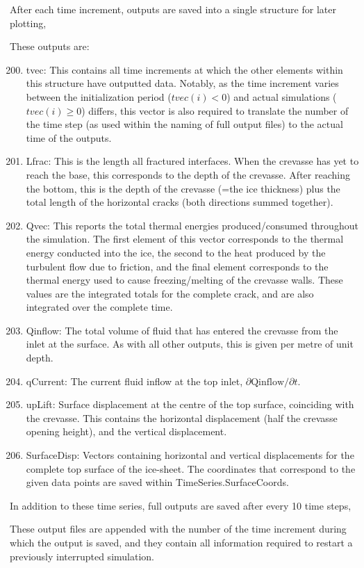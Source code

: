 \documentclass[3p]{elsarticle} %
\begin{document}
After each time increment, outputs are saved into a single structure for later plotting, 

These outputs are:
\begin{enumerate}
  \setcounter{enumi}{199}
  \item tvec: This contains all time increments at which the other elements within this structure have outputted data. Notably, as the time increment varies between the initialization period ($tvec(i)<0$) and actual simulations ($tvec(i)\geq 0$) differs, this vector is also required to translate the number of the time step (as used within the naming of full output files) to the actual time of the outputs.
  \item Lfrac: This is the length all fractured interfaces. When the crevasse has yet to reach the base, this corresponds to the depth of the crevasse. After reaching the bottom, this is the depth of the crevasse (=the ice thickness) plus the total length of the horizontal cracks (both directions summed together).
  \item Qvec: This reports the total thermal energies produced/consumed throughout the simulation. The first element of this vector corresponds to the thermal energy conducted into the ice, the second to the heat produced by the turbulent flow due to friction, and the final element corresponds to the thermal energy used to cause freezing/melting of the crevasse walls. These values are the integrated totals for the complete crack, and are also integrated over the complete time. 
  \item Qinflow: The total volume of fluid that has entered the crevasse from the inlet at the surface. As with all other outputs, this is given per metre of unit depth.  
  \item qCurrent: The current fluid inflow at the top inlet, $\partial \text{Qinflow}/\partial t$.
  \item upLift: Surface displacement at the centre of the top surface, coinciding with the crevasse. This contains the horizontal displacement (half the crevasse opening height), and the vertical displacement.
  \setcounter{enumi}{206}
  \item SurfaceDisp: Vectors containing horizontal and vertical displacements for the complete top surface of the ice-sheet. The coordinates that correspond to the given data points are saved within TimeSeries.SurfaceCoords. 
\end{enumerate}
In addition to these time series, full outputs are saved after every 10 time steps, 

These output files are appended with the number of the time increment during which the output is saved, and they contain all information required to restart a previously interrupted simulation. 
\end{document}
